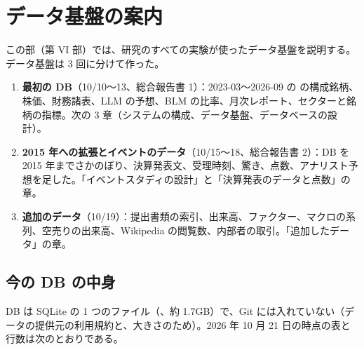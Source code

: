 \chapter{データ基盤の案内}\label{ch:data-guide}

この部（第 VI 部）では、研究のすべての実験が使ったデータ基盤を説明する。データ基盤は 3 回に分けて作った。

\begin{enumerate}
\item \textbf{最初の DB}（10/10〜13、総合報告書 1）：2023-03〜2026-09 の \SP{} の構成銘柄、株価、財務諸表、LLM の予想、BLM の比率、月次レポート、セクターと銘柄の指標。次の 3 章（システムの構成、データ基盤、データベースの設計）。
\item \textbf{2015 年への拡張とイベントのデータ}（10/15〜18、総合報告書 2）：DB を 2015 年までさかのぼり、決算発表文、受理時刻、驚き、点数、アナリスト予想を足した。「イベントスタディの設計」と「決算発表のデータと点数」の章。
\item \textbf{追加のデータ}（10/19）：提出書類の索引、出来高、ファクター、マクロの系列、空売りの出来高、Wikipedia の閲覧数、内部者の取引。「追加したデータ」の章。
\end{enumerate}

\section{今の DB の中身}

DB は SQLite の 1 つのファイル（、約 1.7GB）で、Git には入れていない（データの提供元の利用規約と、大きさのため）。2026 年 10 月 21 日の時点の表と行数は次のとおりである。

